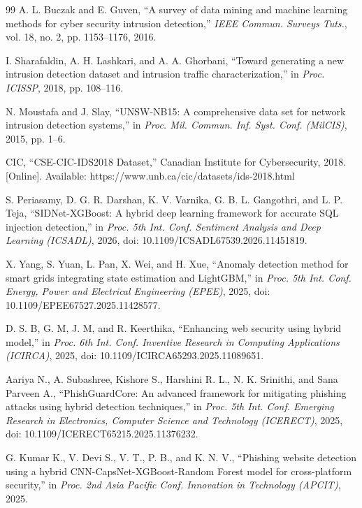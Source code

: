 \documentclass[conference]{IEEEtran}
\begin{document}
\begin{thebibliography}{99}
A. L. Buczak and E. Guven, ``A survey of data mining and machine learning methods for cyber security intrusion detection,'' \textit{IEEE Commun. Surveys Tuts.}, vol. 18, no. 2, pp. 1153--1176, 2016.

I. Sharafaldin, A. H. Lashkari, and A. A. Ghorbani, ``Toward generating a new intrusion detection dataset and intrusion traffic characterization,'' in \textit{Proc. ICISSP}, 2018, pp. 108--116.

N. Moustafa and J. Slay, ``UNSW-NB15: A comprehensive data set for network intrusion detection systems,'' in \textit{Proc. Mil. Commun. Inf. Syst. Conf. (MilCIS)}, 2015, pp. 1--6.

CIC, ``CSE-CIC-IDS2018 Dataset,'' Canadian Institute for Cybersecurity, 2018. [Online]. Available: https://www.unb.ca/cic/datasets/ids-2018.html

S. Periasamy, D. G. R. Darshan, K. V. Varnika, G. B. L. Gangothri, and L. P. Teja, ``SIDNet-XGBoost: A hybrid deep learning framework for accurate SQL injection detection,'' in \textit{Proc. 5th Int. Conf. Sentiment Analysis and Deep Learning (ICSADL)}, 2026, doi: 10.1109/ICSADL67539.2026.11451819.

X. Yang, S. Yuan, L. Pan, X. Wei, and H. Xue, ``Anomaly detection method for smart grids integrating state estimation and LightGBM,'' in \textit{Proc. 5th Int. Conf. Energy, Power and Electrical Engineering (EPEE)}, 2025, doi: 10.1109/EPEE67527.2025.11428577.

D. S. B, G. M, J. M, and R. Keerthika, ``Enhancing web security using hybrid model,'' in \textit{Proc. 6th Int. Conf. Inventive Research in Computing Applications (ICIRCA)}, 2025, doi: 10.1109/ICIRCA65293.2025.11089651.

Aariya N., A. Subashree, Kishore S., Harshini R. L., N. K. Srinithi, and Sana Parveen A., ``PhishGuardCore: An advanced framework for mitigating phishing attacks using hybrid detection techniques,'' in \textit{Proc. 5th Int. Conf. Emerging Research in Electronics, Computer Science and Technology (ICERECT)}, 2025, doi: 10.1109/ICERECT65215.2025.11376232.

G. Kumar K., V. Devi S., V. T., P. B., and K. N. V., ``Phishing website detection using a hybrid CNN-CapsNet-XGBoost-Random Forest model for cross-platform security,'' in \textit{Proc. 2nd Asia Pacific Conf. Innovation in Technology (APCIT)}, 2025.


\end{thebibliography}
\end{document}
